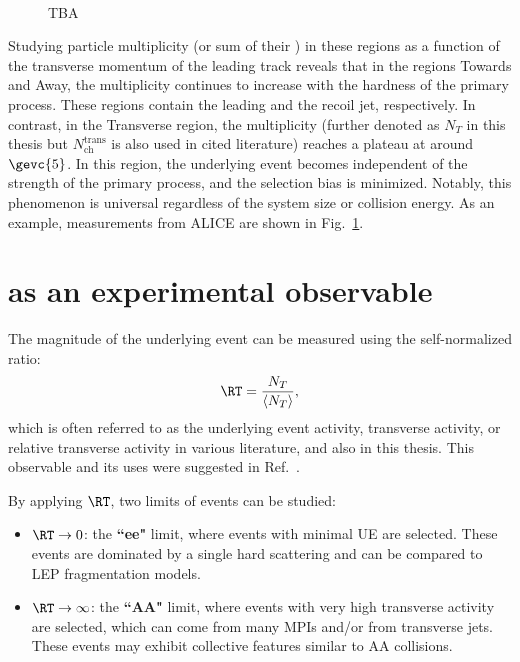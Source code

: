 \begin{figure}%
\\
\caption{TBA}
\label{fig:rt:rtdefi}
\end{figure}

Studying particle multiplicity (or sum of their \pt) in these regions as a function of the transverse momentum of the leading track \ptlead reveals that in the regions Towards and Away, the multiplicity continues to increase with the hardness of the primary process. These regions contain the leading and the recoil jet, respectively. In contrast, in the Transverse region, the multiplicity (further denoted as $N_T$ in this thesis but $N_\mathrm{ch}^\mathrm{trans}$ is also used in cited literature) reaches a plateau at around $\gevc{5}$. In this region, the underlying event becomes independent of the strength of the primary process, and the selection bias is minimized. Notably, this phenomenon is universal regardless of the system size or collision energy. As an example, measurements from ALICE are shown in Fig.~\ref{fig:rt:rtdefi}.

\section{\RT as an experimental observable}

The magnitude of the underlying event can be measured using the self-normalized ratio:
\begin{align}
\RT = \frac{N_T}{\langle N_T \rangle},
\end{align}
which is often referred to as the underlying event activity, transverse activity, or relative transverse activity in various literature, and also in this thesis. This observable and its uses were suggested in Ref.~\cite{skands-rt}.

By applying $\RT$, two limits of events can be studied:
\begin{itemize}
\item $\RT \rightarrow 0$: the \textbf{``ee"} limit, where events with minimal UE are selected. These events are dominated by a single hard scattering and can be compared to LEP fragmentation models.
\item $\RT \rightarrow \infty$: the \textbf{``AA"} limit, where events with very high transverse activity are selected, which can come from many MPIs and/or from transverse jets. These events may exhibit collective features similar to AA collisions.
\end{itemize}

